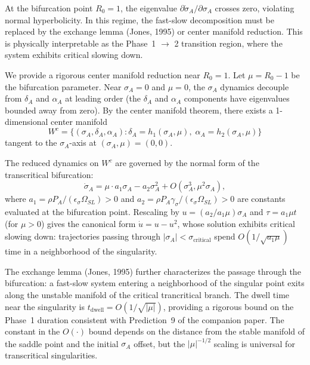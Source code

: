 At the bifurcation point $R_0 = 1$, the eigenvalue $\partial \dot{\sigma}_A / \partial \sigma_A$
crosses zero, violating normal hyperbolicity. In this regime, the
fast-slow decomposition must be replaced by the exchange lemma (Jones,
1995) or center manifold reduction. This is physically interpretable as
the Phase~1 $\to$ 2 transition region, where the system exhibits critical
slowing down.

We provide a rigorous center manifold reduction near $R_0 = 1$. Let
$\mu = R_0 - 1$ be the bifurcation parameter. Near $\sigma_A = 0$ and
$\mu = 0$, the $\sigma_A$ dynamics decouple from $\delta_A$ and $\alpha_A$
at leading order (the $\delta_A$ and $\alpha_A$ components have eigenvalues
bounded away from zero). By the center manifold theorem, there exists a
1-dimensional center manifold
\[
W^c = \{ (\sigma_A, \delta_A, \alpha_A) : \delta_A = h_1(\sigma_A, \mu),\;
\alpha_A = h_2(\sigma_A, \mu) \}
\]
tangent to the $\sigma_A$-axis at $(\sigma_A, \mu) = (0, 0)$.

The reduced dynamics on $W^c$ are governed by the normal form of the
transcritical bifurcation:
\[
\dot{\sigma}_A = \mu \cdot a_1 \sigma_A - a_2 \sigma_A^2 + O(\sigma_A^3, \mu^2 \sigma_A),
\]
where $a_1 = \rho P_A / (\epsilon_\sigma \Omega_{SL}) > 0$ and
$a_2 = \rho P_A \gamma_\sigma / (\epsilon_\sigma \Omega_{SL}) > 0$ are
constants evaluated at the bifurcation point. Rescaling by
$u = (a_2 / a_1 \mu) \sigma_A$ and $\tau = a_1 \mu t$ (for $\mu > 0$)
gives the canonical form $\dot{u} = u - u^2$, whose solution exhibits
critical slowing down: trajectories passing through
$|\sigma_A| < \sigma_{\mathrm{critical}}$ spend
$O(1 / \sqrt{a_1 \mu})$ time in a neighborhood of the singularity.

The exchange lemma (Jones, 1995) further characterizes the passage
through the bifurcation: a fast-slow system entering a neighborhood of
the singular point exits along the unstable manifold of the critical
trancritical branch. The dwell time near the singularity is
$t_{\mathrm{dwell}} = O(1/\sqrt{|\mu|})$, providing a rigorous bound
on the Phase~1 duration consistent with Prediction~9 of the companion
paper. The constant in the $O(\cdot)$ bound depends on the distance
from the stable manifold of the saddle point and the initial $\sigma_A$
offset, but the $|\mu|^{-1/2}$ scaling is universal for transcritical
singularities.

